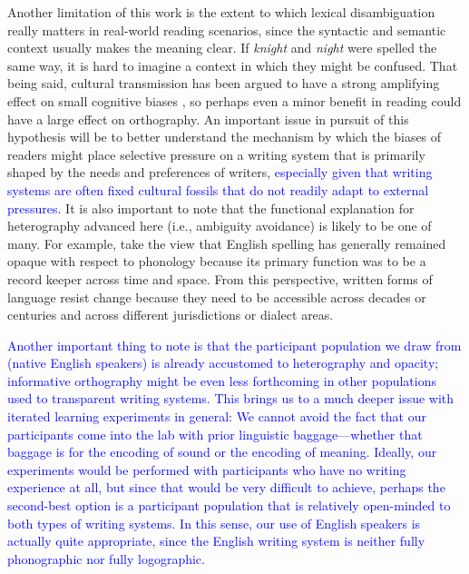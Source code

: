 \documentclass[doc,biblatex]{apa7}
\newcommand\newmaterial[1]{\textcolor{blue}{#1}}
\begin{document}
Another limitation of this work is the extent to which lexical disambiguation really matters in real-world reading scenarios, since the syntactic and semantic context usually makes the meaning clear. If \textit{knight} and \textit{night} were spelled the same way, it is hard to imagine a context in which they might be confused. That being said, cultural transmission has been argued to have a strong amplifying effect on small cognitive biases \parencite{Thompson:2016}, so perhaps even a minor benefit in reading could have a large effect on orthography. An important issue in pursuit of this hypothesis will be to better understand the mechanism by which the biases of readers might place selective pressure on a writing system that is primarily shaped by the needs and preferences of writers, \newmaterial{especially given that writing systems are often fixed cultural fossils that do not readily adapt to external pressures.} It is also important to note that the functional explanation for heterography advanced here (i.e., ambiguity avoidance) is likely to be one of many. For example, \textcite{Stenroos:2016} take the view that English spelling has generally remained opaque with respect to phonology because its primary function was to be a record keeper across time and space. From this perspective, written forms of language resist change because they need to be accessible across decades or centuries and across different jurisdictions or dialect areas.

\newmaterial{Another important thing to note is that the participant population we draw from (native English speakers) is already accustomed to heterography and opacity; informative orthography might be even less forthcoming in other populations used to transparent writing systems. This brings us to a much deeper issue with iterated learning experiments in general: We cannot avoid the fact that our participants come into the lab with prior linguistic baggage---whether that baggage is for the encoding of sound or the encoding of meaning. Ideally, our experiments would be performed with participants who have no writing experience at all, but since that would be very difficult to achieve, perhaps the second-best option is a participant population that is relatively open-minded to both types of writing systems. In this sense, our use of English speakers is actually quite appropriate, since the English writing system is neither fully phonographic nor fully logographic.}
\end{document}
